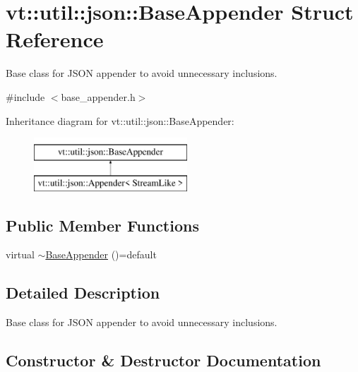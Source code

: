 \hypertarget{structvt_1_1util_1_1json_1_1_base_appender}{}\section{vt\+:\+:util\+:\+:json\+:\+:Base\+Appender Struct Reference}
\label{structvt_1_1util_1_1json_1_1_base_appender}


Base class for J\+S\+ON appender to avoid unnecessary inclusions.  




{\ttfamily \#include $<$base\+\_\+appender.\+h$>$}

Inheritance diagram for vt\+:\+:util\+:\+:json\+:\+:Base\+Appender\+:\begin{figure}[H]
\begin{center}
\leavevmode
\includegraphics[height=2.000000cm]{structvt_1_1util_1_1json_1_1_base_appender}
\end{center}
\end{figure}
\subsection*{Public Member Functions}
\begin{DoxyCompactItemize}
\item 
virtual \hyperlink{structvt_1_1util_1_1json_1_1_base_appender_ab8d386b5afc5bc34e35e075be0dcbfd1}{$\sim$\+Base\+Appender} ()=default
\end{DoxyCompactItemize}


\subsection{Detailed Description}
Base class for J\+S\+ON appender to avoid unnecessary inclusions. 

\subsection{Constructor \& Destructor Documentation}
\mbox{\label{structvt_1_1util_1_1json_1_1_base_appender_ab8d386b5afc5bc34e35e075be0dcbfd1}} 
